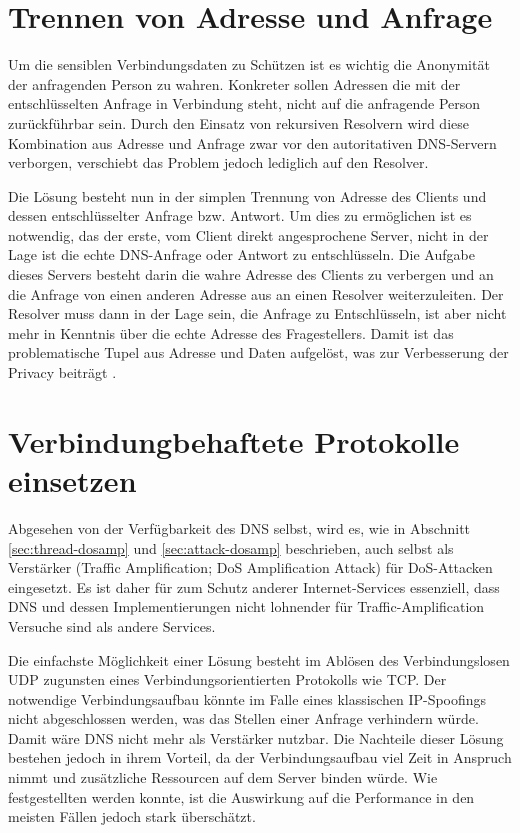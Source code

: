 \section{Trennen von Adresse und Anfrage}
\label{sec:goals-sourceanon}
Um die sensiblen Verbindungsdaten zu Schützen ist es wichtig die Anonymität der anfragenden Person zu wahren. Konkreter sollen Adressen die mit der entschlüsselten Anfrage in Verbindung steht, nicht auf die anfragende Person zurückführbar sein. Durch den Einsatz von rekursiven Resolvern wird diese Kombination aus Adresse und Anfrage zwar vor den autoritativen DNS-Servern verborgen, verschiebt das Problem jedoch lediglich auf den Resolver. 

Die Lösung besteht nun in der simplen Trennung von Adresse des Clients und dessen entschlüsselter Anfrage bzw. Antwort. Um dies zu ermöglichen ist es notwendig, das der erste, vom Client direkt angesprochene Server, nicht in der Lage ist die echte DNS-Anfrage oder Antwort zu entschlüsseln. Die Aufgabe dieses Servers besteht darin die wahre Adresse des Clients zu verbergen und an die Anfrage von einen anderen Adresse aus an einen Resolver weiterzuleiten. Der Resolver muss dann in der Lage sein, die Anfrage zu Entschlüsseln, ist aber nicht mehr in Kenntnis über die echte Adresse des Fragestellers. Damit ist das problematische Tupel aus Adresse und Daten aufgelöst, was zur Verbesserung der Privacy beiträgt \cite{Schmitt2018}.

\section{Verbindungbehaftete Protokolle einsetzen}
\label{sec:goals-trafficamp}
Abgesehen von der Verfügbarkeit des DNS selbst, wird es, wie in Abschnitt \ref{sec:thread-dosamp} und \ref{sec:attack-dosamp} beschrieben, auch selbst als Verstärker (Traffic Amplification; DoS Amplification Attack) für DoS-Attacken eingesetzt. Es ist daher für zum Schutz anderer Internet-Services essenziell, dass DNS und dessen Implementierungen nicht lohnender für Traffic-Amplification Versuche sind als andere Services.

Die einfachste Möglichkeit einer Lösung besteht im Ablösen des Verbindungslosen UDP zugunsten eines Verbindungsorientierten Protokolls wie TCP. Der notwendige Verbindungsaufbau könnte im Falle eines klassischen IP-Spoofings nicht abgeschlossen werden, was das Stellen einer Anfrage verhindern würde. Damit wäre DNS nicht mehr als Verstärker nutzbar. Die Nachteile dieser Lösung bestehen jedoch in ihrem Vorteil, da der Verbindungsaufbau viel Zeit in Anspruch nimmt und zusätzliche Ressourcen auf dem Server binden würde. Wie festgestellten werden konnte, ist die Auswirkung auf die Performance in den meisten Fällen jedoch stark überschätzt\cite{Zhu2015}.

